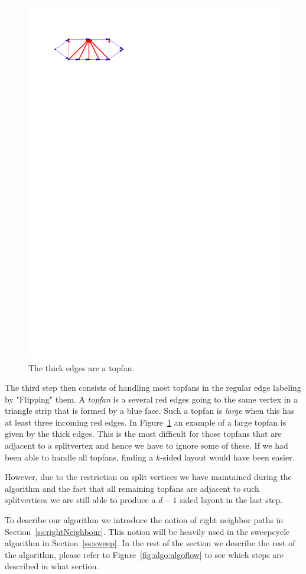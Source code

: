   \begin{figure}
    \centering
    \includegraphics[]{unifiedAlgo/img/topfanExample.pdf}
    \caption{The thick edges are a topfan.}
    \label{fig:algo:topfanExample}
  \end{figure}

  The third step then consists of handling most topfans in the regular edge labeling by "Flipping" them.
  A \emph{topfan} is a several red edges going to the same vertex in a triangle strip that is formed by a blue face.
  Such a topfan is \emph{large} when this has at least three incoming red edges.
  In Figure~\ref{fig:algo:topfanExample} an example of a large topfan is given by the thick edges.
  This is the most difficult for those topfans that are adjacent to a splitvertex and hence we have to ignore some of these.
  If we had been able to handle all topfans, finding a $k$-sided layout would have been easier.

  However, due to the restriction on split vertices we have maintained during the algorithm and the fact that all remaining topfans are adjacent to such splitvertices we are still able to produce a $d-1$ sided layout in the last step.

  To describe our algorithm we introduce the notion of right neighbor paths in Section~\ref{ss:rightNeighbour}. This notion will be heavily used in the sweepcycle algorithm in Section~\ref{ss:sweep}. In the rest of the section we describe the rest of the algorithm, please refer to Figure~\ref{fig:algo:algoflow} to see which steps are described in what section.
